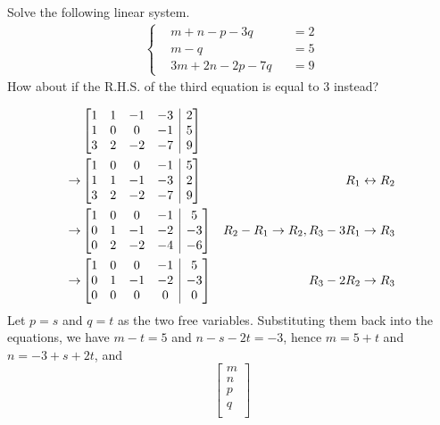 \begin{Exercise}
Solve the following linear system.
\begin{align*}
\left\{\begin{alignedat}{2}
&m + n - p - 3q& &= 2\\
&m - q& &= 5\\
&3m + 2n - 2p - 7q& &= 9
\end{alignedat}\right.
\end{align*}
How about if the R.H.S. of the third equation is equal to $3$ instead?
\end{Exercise}
\begin{Answer}
\begin{align*}
&\left[
\begin{array}{@{}cccc|c@{}}
1 & 1 & -1 & -3 & 2\\
1 & 0 & 0 & -1 & 5\\
3 & 2 & -2 & -7 & 9
\end{array}
\right]\\
\to &
\left[
\begin{array}{@{}cccc|c@{}}
1 & 0 & 0 & -1 & 5\\
1 & 1 & -1 & -3 & 2\\
3 & 2 & -2 & -7 & 9
\end{array}
\right] & R_1 \leftrightarrow R_2 \\
\to &
\left[
\begin{array}{@{}cccc|c@{}}
1 & 0 & 0 & -1 & 5\\
0 & 1 & -1 & -2 & -3\\
0 & 2 & -2 & -4 & -6
\end{array}
\right] & R_2 - R_1 \to R_2, R_3 - 3R_1 \to R_3
\\
\to &
\left[
\begin{array}{@{}cccc|c@{}}
1 & 0 & 0 & -1 & 5\\
0 & 1 & -1 & -2 & -3\\
0 & 0 & 0 & 0 & 0
\end{array}
\right] & R_3 - 2R_2 \to R_3
\end{align*}
Let $p = s$ and $q = t$ as the two free variables. Substituting them back into the equations, we have $m-t=5$ and $n-s-2t=-3$, hence $m=5+t$ and $n=-3+s+2t$, and
\begin{equation*}
\begin{bmatrix}
m\\
n\\
p\\
q\\
\end{bmatrix}

\end{equation*}
\end{Answer}
